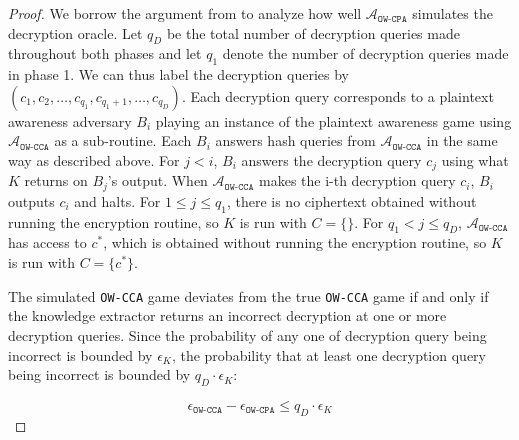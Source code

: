 \documentclass{article}
\newcommand{\monospace}{\texttt}
\begin{document}
\begin{proof}
    We borrow the argument from \cite{bellare1998relations} to analyze how well $\mathcal{A}_\monospace{OW-CPA}$ simulates the decryption oracle. Let $q_D$ be the total number of decryption queries made throughout both phases and let $q_1$ denote the number of decryption queries made in phase 1. We can thus label the decryption queries by $(c_1, c_2, \ldots, c_{q_1}, c_{q_1 + 1}, \ldots, c_{q_D})$. Each decryption query corresponds to a plaintext awareness adversary $B_i$ playing an instance of the plaintext awareness game using $\mathcal{A}_\monospace{OW-CCA}$ as a sub-routine. Each $B_i$ answers hash queries from $\mathcal{A}_\monospace{OW-CCA}$ in the same way as described above. For $j < i$, $B_i$ answers the decryption query $c_j$ using what $K$ returns on $B_j$'s output. When $\mathcal{A}_\monospace{OW-CCA}$ makes the i-th decryption query $c_i$, $B_i$ outputs $c_i$ and halts. For $1 \leq j \leq q_1$, there is no ciphertext obtained without running the encryption routine, so $K$ is run with $C = \{\}$. For $q_1 < j \leq q_D$, $\mathcal{A}_\monospace{OW-CCA}$ has access to $c^\ast$, which is obtained without running the encryption routine, so $K$ is run with $C = \{c^\ast\}$.

    The simulated \monospace{OW-CCA} game deviates from the true \monospace{OW-CCA} game if and only if the knowledge extractor returns an incorrect decryption at one or more decryption queries. Since the probability of any one of decryption query being incorrect is bounded by $\epsilon_K$, the probability that at least one decryption query being incorrect is bounded by $q_D \cdot \epsilon_K$:

    \begin{equation*}
        \epsilon_\monospace{OW-CCA} - \epsilon_\monospace{OW-CPA}
        \leq q_D \cdot \epsilon_K
    \end{equation*}
\end{proof}



\end{document}
